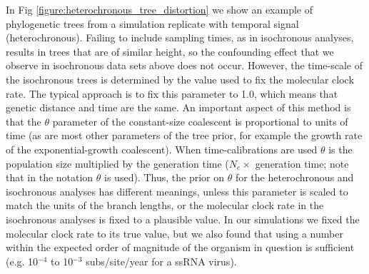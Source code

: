 \documentclass[10pt,letterpaper]{article}
\begin{document}
In Fig \ref{figure:heterochronous_tree_distortion} we show an example of phylogenetic trees from a simulation replicate with temporal signal (heterochronous). Failing to include sampling times, as in isochronous analyses, results in trees that are of similar height, so the confounding effect that we observe in isochronous data sets above does not occur. However, the time-scale of the isochronous trees is determined by the value used to fix the molecular clock rate. The typical approach is to fix this parameter to 1.0, which means that genetic distance and time are the same. An important aspect of this method is that the $\theta$ parameter of the constant-size coalescent is proportional to units of time \cite{ho2011skyline, drummond2002estimating} (as are most other parameters of the tree prior, for example the growth rate of the exponential-growth coalescent). When time-calibrations are used $\theta$ is the population size multiplied by the generation time ($N_e \times$ generation time; note that in \cite{drummond2002estimating} the notation $\theta$ is used). Thus, the prior on $\theta$ for the heterochronous and isochronous analyses has different meanings, unless this parameter is scaled to match the units of the branch lengths, or the molecular clock rate in the isochronous analyses is fixed to a plausible value. In our simulations we fixed the molecular clock rate to its true value, but we also found that using a number within the expected order of magnitude of the organism in question is sufficient (e.g. 10$^{-4}$ to 10$^{-3}$ subs/site/year for a ssRNA virus).
\end{document}
